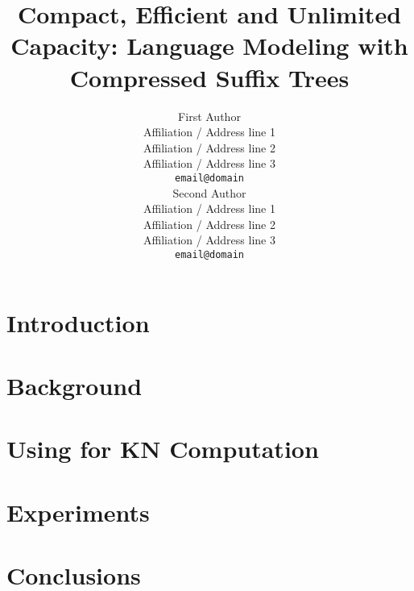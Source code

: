 \documentclass[11pt,a4paper]{article}
\title{Compact, Efficient and Unlimited Capacity:
    Language Modeling with Compressed Suffix Trees}
\author{First Author \\
  Affiliation / Address line 1 \\
  Affiliation / Address line 2 \\
  Affiliation / Address line 3 \\
  {\tt email@domain} \\\And
  Second Author \\
  Affiliation / Address line 1 \\
  Affiliation / Address line 2 \\
  Affiliation / Address line 3 \\
  {\tt email@domain} \\}
\date{}
\begin{document}
\maketitle
\begin{abstract}
  
\end{abstract}

\section{Introduction}
\label{sec-intro}




\section{Background}
\label{sec-suffix}




\section{Using \CSTs for KN Computation}
\label{sec-lmsdsl}


\section{Experiments}
\label{sec-experiments}



\section{Conclusions}
\label{sec-conclusions}




\end{document}
